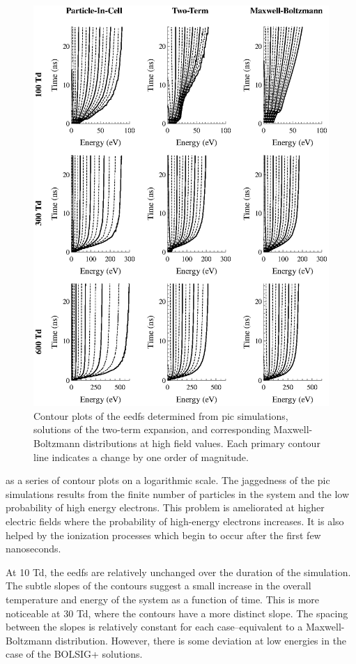 \begin{figure}
  \centering
  \includegraphics{./chapters/modeling/figures/picmb2.eps}
  \caption{Contour plots of the \acs{eedf}s determined from \acs{pic}
    simulations, solutions of the two-term expansion, and corresponding
    Maxwell-Boltzmann distributions at high field values. Each primary contour
    line indicates a change by one order of magnitude.}
  \label{fig:picmb2}
\end{figure}
as a series of contour plots on a logarithmic scale. The jaggedness of the
\acs{pic} simulations results from the finite number of particles in the system
and the low probability of high energy electrons. This problem is ameliorated at
higher electric fields where the probability of high-energy electrons increases.
It is also helped by the ionization processes which begin to occur after the
first few nanoseconds.

At 10 Td, the \acs{eedf}s are relatively unchanged over the duration of the
simulation. The subtle slopes of the contours suggest a small increase in the
overall temperature and energy of the system as a function of time. This is more
noticeable at 30 Td, where the contours have a more distinct slope. The spacing
between the slopes is relatively constant for each case--equivalent to a
Maxwell-Boltzmann distribution. However, there is some deviation at low energies
in the case of the BOLSIG+ solutions.

